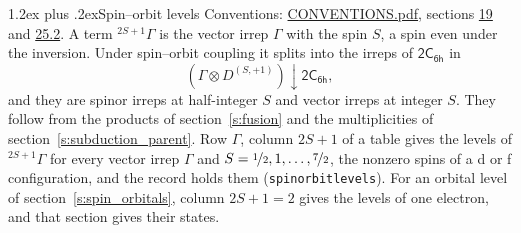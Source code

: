 \documentclass[10pt,a4paper]{article}
\makeatletter
\renewcommand\section{\@startsection{section}{1}{\z@}{-3ex plus -1ex minus -.2ex}%
  {1.2ex plus .2ex}{\normalfont\large\sffamily\bfseries\color{parttitle}}}
\numberwithin{equation}{section}
\newcommand{\grp}[1]{\mathsf{#1}}
\newcommand{\restr}[2]{#1\!\downarrow#2}
\newcommand{\irrJp}[2]{D^{(#1,#2)}}
\newcommand{\irrprod}{\otimes}
\newcommand{\term}[2]{{}^{#1}#2}
\makeatother
\begin{document}
\section{Spin--orbit levels}\label{s:spin_orbit}
Conventions: \href{../../CONVENTIONS.pdf}{CONVENTIONS.pdf}, sections \href{../../../rotation/CONVENTIONS.pdf\#conv.19}{19} and \href{../../CONVENTIONS.pdf\#conv.25.2}{25.2}.
\leavevmode\label{n:local.spin}\label{n:symbol.term}A term $\term{2S+1}{\Gamma}$ is the vector irrep $\Gamma$ with the spin $S$, a spin even under the inversion. Under spin--orbit coupling it splits into the irreps of $\grp{2C_{6h}}$ in
\begin{equation}\label{e:spinorbit}\restr{(\Gamma \irrprod \irrJp{S}{+1})}{\grp{2C_{6h}}},\end{equation}
and they are spinor irreps at half-integer $S$ and vector irreps at integer $S$. They follow from the products of section~\ref{s:fusion} and the multiplicities of section~\ref{s:subduction_parent}. Row $\Gamma$, column $2S + 1$ of a table gives the levels of $\term{2S+1}{\Gamma}$ for every vector irrep $\Gamma$ and $S = \nicefrac{1}{2}, 1, \dots, \nicefrac{7}{2}$, the nonzero spins of a d or f configuration, and the record holds them (\texttt{spinorbitlevels}). For an orbital level of section~\ref{s:spin_orbitals}, column $2S + 1 = 2$ gives the levels of one electron, and that section gives their states.
\end{document}
